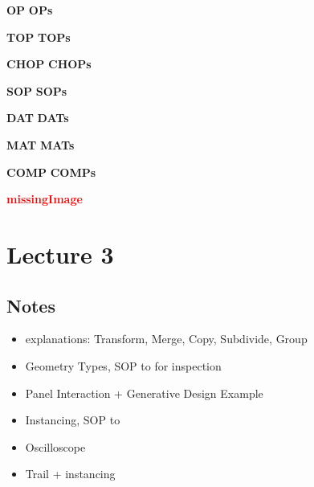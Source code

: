\def\boldcommandlist{\@elt OP,\@elt OPs,}
\def\@elt#1,{%
 \expandafter\def\csname#1\endcsname{\textbf{#1}\xspace}
}
\boldcommandlist

\def\topColorList{\@elt TOP,\@elt TOPs,}
\def\@elt#1,{%
 \expandafter\def\csname#1\endcsname{\textcolor{TOP}{\textbf{#1}}\xspace}
}
\topColorList

\def\chopColorList{\@elt CHOP,\@elt CHOPs,}
\def\@elt#1,{%
 \expandafter\def\csname#1\endcsname{\textcolor{CHOP}{\textbf{#1}}\xspace}
}
\chopColorList

\def\sopColorList{\@elt SOP,\@elt SOPs,}
\def\@elt#1,{%
 \expandafter\def\csname#1\endcsname{\textcolor{SOP}{\textbf{#1}}\xspace}
}
\sopColorList

\def\datColorList{\@elt DAT,\@elt DATs,}
\def\@elt#1,{%
 \expandafter\def\csname#1\endcsname{\textcolor{DAT}{\textbf{#1}}\xspace}
}
\datColorList

\def\matColorList{\@elt MAT,\@elt MATs,}
\def\@elt#1,{%
 \expandafter\def\csname#1\endcsname{\textcolor{MAT}{\textbf{#1}}\xspace}
}
\matColorList


\def\compColorList{\@elt COMP,\@elt COMPs,}
\def\@elt#1,{%
 \expandafter\def\csname#1\endcsname{\textcolor{COMP}{\textbf{#1}}\xspace}
}
\compColorList

\def\redcommandlist{\@elt missingImage,}
\def\@elt#1,{%
 \expandafter\def\csname#1\endcsname{\textcolor{red}{\textbf{#1}}\xspace}
}
\redcommandlist


\chapter{Lecture 3}

\section{Notes}

\begin{itemize}
	\item \SOPs explanations: Transform, Merge, Copy, Subdivide, Group
	\item Geometry Types, SOP to \DAT for inspection
	\item Panel Interaction + Generative Design Example
	\item Instancing, SOP to \CHOP
	\item Oscilloscope
	\item Trail \CHOP + instancing


\end{itemize}



